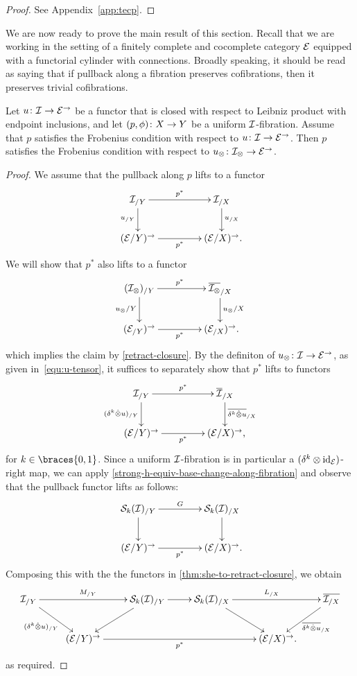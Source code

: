 \documentclass[reqno,10pt,a4paper,oneside,draft]{amsart}
\begin{document}
\begin{proof} See Appendix~\ref{app:tecp}.
\end{proof}

We are now ready to prove the main result of this section.
Recall that we are working in the setting of a finitely complete and cocomplete category $\cal{E}$ equipped with a functorial cylinder with connections. Broadly speaking, it should be read as saying that if pullback along a fibration preserves cofibrations,
then it preserves trivial cofibrations.

\begin{theorem} \label{thm:frobenius-fibrations}
Let $u \co \cal{I} \to \catE^\to$ be a functor that is closed with respect to Leibniz product with endpoint inclusions, and let 
$(p,\phi) \co X \to Y$ be a uniform $\cal{I}$-fibration. Assume that $p$ satisfies the Frobenius condition with respect to $u \co \cal{I}
\to \cal{E}^\to$. Then $p$ satisfies the Frobenius condition with respect  to $u_\otimes \co \cal{I}_\otimes \to \catE^\to$.
\end{theorem}

\begin{proof} We assume that the pullback along $p$ lifts to a functor
\[
\xymatrix@C+2em{
  \cal{I}_{/Y}
  \ar[r]^{p^*}
  \ar[d]_{u_{/Y}}
&
  \cal{I}_{/X}
  \ar[d]^{u_{/X}}
\\
  (\catE / Y)^\to
  \ar[r]_{p^*}
&
  (\catE / X)^\to \rlap{.}
}
\]
We will show that $p^*$ also lifts to a functor
\[
\xymatrix@C+2em{
  (\cal{I}_\otimes)_{/Y} \ar[r]^{p^*} \ar[d]_{u_{\otimes}/Y} & \overline{\cal{I}_\otimes}_{/X} \ar[d]^{u_{\otimes}/X} \\
  (\cal{E}_{/Y})^\to \ar[r]_{p^*} & (\cal{E}_{/X})^\to \rlap{.}
}
\]
which implies the claim by \cref{retract-closure}.
By the definiton of $u_\otimes \co \cal{I} \to \catE^\to$, as given in~\eqref{equ:u-tensor}, 
it  suffices to separately show that $p^*$ lifts to functors
\[
\xymatrix@C+2em{
  \cal{I}_{/Y}
  \ar[r]^{p^*}
  \ar[d]_{(\kcyl \hatotimes u)_{/Y}}
&
  \overline{\cal{I}}_{/X}
  \ar[d]^{ \overline{\kcyl \hatotimes u}_{/X}}
\\
  (\catE / Y)^\to
  \ar[r]_{p^*}
&
  (\catE / X)^\to \rlap{,}
}
\]
for $k \in \braces{0, 1}$.
Since a uniform $\cal{I}$-fibration is in particular a $(\kcyl \otimes \id_\catE)$-right map, we can apply \cref{strong-h-equiv-base-change-along-fibration} and observe that the pullback functor lifts as follows:
\[
\xymatrix@C+2em{
  \cal{S}_k(\cal{I})_{/Y}
  \ar[r]^{G}
  \ar[d]
&
  \cal{S}_k(\cal{I})_{/X}
  \ar[d] \\
  (\catE / Y)^\to
  \ar[r]_{p^*}
&
  (\catE / X)^\to \rlap{.}
}
\]
Composing this with the the functors in \cref{thm:she-to-retract-closure}, we obtain
\[
\xymatrix{
  \cal{I}_{/Y}
  \ar[rr]^{M_{/Y}}
  \ar[dr]_{(\kcyl \hatotimes u)_{/Y}} &
&
  \cal{S}_k(\cal{I})_{/Y}
  \ar[r]
  \ar[dl]
&
  \cal{S}_k(\cal{I})_{/X}
  \ar[rr]^{L_{/X}}
  \ar[dr]
& &
  \overline{\cal{I}_{/X}}
  \ar[dl]^{\overline{\kcyl \hatotimes u}_{/X}}
\\ &
  (\catE/Y)^\to
  \ar[rrr]_{p^*}
&&&
  (\catE/X)^\to \rlap{.}
}
\]
as required.
\end{proof}
\end{document}
